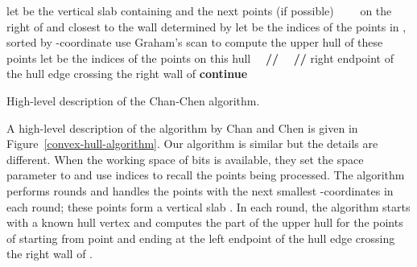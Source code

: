 \documentclass[final,onetabnum,onefignum,onethmnum]{siamltex}
\begin{document}
\begin{algorithm2e}[tb!]
\begin{minipage}{1.0\textwidth}
\SetStartEndCondition{ }{}{}
\DontPrintSemicolon
\Proc{{\rm -}{\rm -}}

\;
\For {} {
   {
     \;
  }
}  

\While {} { 

  let  be the vertical slab containing  and the next  points (if
  possible)\;
~~~~on the right of and closest to the wall determined by \; 
  let  be the indices of the  points in
  , sorted by -coordinate\; 
  use Graham's scan to compute the upper hull of these points\;
  let  be the indices of the points
  on this hull ~~\textbf{//} \;
   ~~\textbf{//} right endpoint of the hull edge crossing the right wall of \;
   {
     {
       \textbf{continue}
    }
    \While {} {
      \;
    }
      \;
  }
  \For {} {
    \;
  }
  \;
}
\end{minipage}

\caption{High-level description of the Chan-Chen algorithm.\label{convex-hull-algorithm}}
\end{algorithm2e}

A high-level description of the algorithm by Chan and Chen \cite{CC07}
is given in Figure~\ref{convex-hull-algorithm}. Our algorithm is
similar but the details are different.  When the working space
of  bits is available, they set the space
parameter  to  and use  indices to recall
the points being processed. The algorithm performs  rounds and handles the  points with the next smallest 
-coordinates in each round; these points form a vertical slab
. In each round, the algorithm starts with a known hull vertex
 and computes the part of the upper hull for the points of
 starting from point  and ending at the left endpoint
of the hull edge crossing the right wall of .
\end{document}
